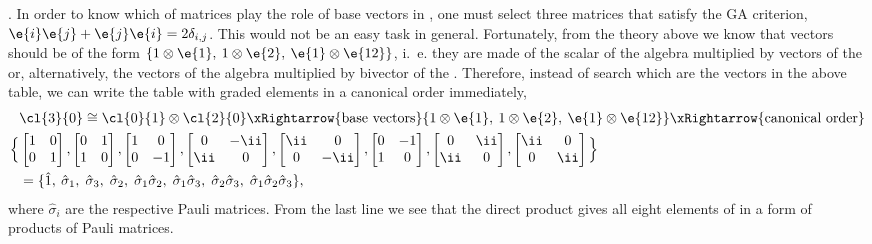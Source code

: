 \begin{example}
. In order to know which of matrices play the role of
base vectors in , one must select three matrices that
satisfy the GA criterion, $\e{i}\e{j}+\e{j}\e{i}=2\delta_{i,j}$.
This would not be an easy task in general. Fortunately, from 
the theory above we know that vectors should be of the form
$\{1\otimes\e{1},\:1\otimes\e{2},\:\e{1}\otimes\e{12}\}$, i.~e.
they are made of the scalar of the  algebra multiplied by
vectors of the  or, alternatively, the vectors of the
 algebra multiplied by bivector of the .
Therefore, instead of search which are the vectors in the above
table, we can write the table with graded elements in a canonical
order immediately,
\[\begin{split}
&\cl{3}{0}\cong\cl{0}{1}\otimes\cl{2}{0}
\xRightarrow{\textrm{base vectors}} \{1\otimes\e{1},\:1\otimes\e{2},\:\e{1}\otimes\e{12}\}
 \xRightarrow{\textrm{canonical order}}\\
\Big\{
 &\begin{bmatrix}1&0\\0&1\end{bmatrix},
\begin{bmatrix}0&1\\1&0\end{bmatrix},
\begin{bmatrix}1&0\\0&-1\end{bmatrix},
\begin{bmatrix}0&-\ii\\\ii&0\end{bmatrix},
\begin{bmatrix}\ii&0\\0&-\ii\end{bmatrix},
\begin{bmatrix}0&-1\\1&0\end{bmatrix},
\begin{bmatrix}0&\ii\\\ii&0\end{bmatrix},
\begin{bmatrix}\ii&0\\0&\ii\end{bmatrix}
\Big\}\\
&=\{\hat{1},\:\hat{\sigma}_1,\;\hat{\sigma}_3,
\;\hat{\sigma}_2,\;\hat{\sigma}_1\hat{\sigma}_2,
\;\hat{\sigma}_1\hat{\sigma}_3,\;\hat{\sigma}_2\hat{\sigma}_3,
\;\hat{\sigma}_1\hat{\sigma}_2\hat{\sigma}_3\},
\end{split}\]
where $\hat{\sigma}_i$ are the respective Pauli matrices. From the
last line we see that the direct product gives all eight elements
of  in a form of products of Pauli matrices.
\end{example}
